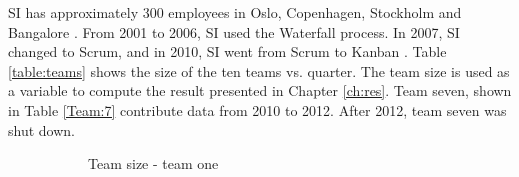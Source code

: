 \documentclass[UKenglish]{ifimaster}  %
\begin{document}
SI has approximately 300 employees in Oslo, Copenhagen, Stockholm and Bangalore \parencite{SI}. From 2001 to 2006, SI used the Waterfall process. In 2007, SI changed to Scrum, and in 2010, SI went from Scrum to Kanban \parencite{Dag}.
\newpage
Table \ref{table:teams} shows the size of the ten teams vs. quarter. The team size is used as a variable to compute the result presented in Chapter \ref{ch:res}. Team seven, shown in Table \ref{Team:7} contribute data from 2010 to 2012. After 2012, team seven was shut down.

\begin{figure}[h]
\begin{subfigure}[b]{.2\textwidth}
\center
\caption{Team size - team one}
 \label{Team:1}
\end{subfigure}
\begin{subfigure}[b]{.2\textwidth}
\center
\end{subfigure}
\end{figure}
\end{document}
